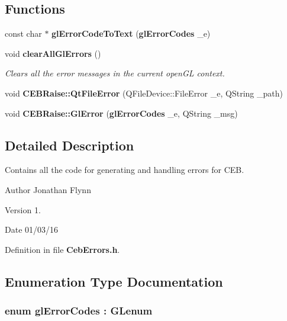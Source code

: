 \subsection*{Functions}
\begin{DoxyCompactItemize}
\item 
const char $\ast$ {\bf gl\-Error\-Code\-To\-Text} ({\bf gl\-Error\-Codes} \-\_\-e)
\item 
void {\bf clear\-All\-Gl\-Errors} ()
\begin{DoxyCompactList}\small\item\em Clears all the error messages in the current open\-G\-L context. \end{DoxyCompactList}\item 
void {\bf C\-E\-B\-Raise\-::\-Qt\-File\-Error} (Q\-File\-Device\-::\-File\-Error \-\_\-e, Q\-String \-\_\-path)
\item 
void {\bf C\-E\-B\-Raise\-::\-Gl\-Error} ({\bf gl\-Error\-Codes} \-\_\-e, Q\-String \-\_\-msg)
\end{DoxyCompactItemize}


\subsection{Detailed Description}
Contains all the code for generating and handling errors for C\-E\-B. \begin{DoxyAuthor}{Author}
Jonathan Flynn 
\end{DoxyAuthor}
\begin{DoxyVersion}{Version}
1. 
\end{DoxyVersion}
\begin{DoxyDate}{Date}
01/03/16 
\end{DoxyDate}


Definition in file {\bf Ceb\-Errors.\-h}.



\subsection{Enumeration Type Documentation}
\subsubsection[{gl\-Error\-Codes}]{\setlength{\rightskip}{0pt plus 5cm}enum {\bf gl\-Error\-Codes} \-: G\-Lenum}\label{_ceb_errors_8h_a2847932b5d61ef44cc6e0cb827004e08}


